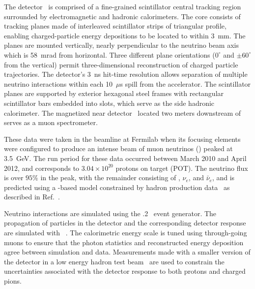 
The \minerva detector~\cite{Aliaga:2013uqz} is comprised of a fine-grained scintillator 
central tracking region surrounded by electromagnetic and hadronic calorimeters. 
The core consists of tracking planes made of interleaved scintillator 
strips of triangular profile, enabling charged-particle energy depositions 
to be located to within 3~mm. The planes are mounted vertically, nearly perpendicular 
to the neutrino beam axis which is 58~mrad from horizontal.   
Three different plane orientations ($0^{\circ}$ and $\pm 60^{\circ}$ from the vertical) 
permit three-dimensional reconstruction of charged particle trajectories. 
The detector's 3~ns hit-time resolution allows separation of multiple neutrino interactions 
within each 10~$\mu$s spill from the accelerator. The scintillator planes
are supported by exterior hexagonal steel frames with rectangular 
scintillator bars embedded into slots, which serve as the side hadronic calorimeter. 
The magnetized \minos near detector~\cite{Michael:2008bc} located two meters 
downstream of \minerva serves as a muon spectrometer. 

These data were taken in the \numi beamline at Fermilab when its focusing elements 
were configured to produce an intense beam of muon neutrinos (\numu) peaked at 3.5~GeV. 
The run period for these data occurred between March 2010 and April 2012, and 
corresponds to $3.04\times{10}^{20}$ protons on target (POT). The neutrino flux is over 
$95\%$ \numu in the peak, with the remainder consisting of 
\numubar, $\nu_e$, and $\bar\nu_e$, and is predicted using a \geant-based model 
constrained by hadron production data~\cite{Alt:2006fr} 
as described in Ref.~\cite{Eberly:2014mra}.  

Neutrino interactions are simulated using the .2~\cite{Andreopoulos:2009rq} 
event generator. The propagation of particles in the detector and the corresponding detector response  
are simulated with \geant~\cite{Agostinelli:2002hh}. The calorimetric 
energy scale is tuned using through-going muons to ensure that the photon
statistics and reconstructed energy deposition agree between simulation and data.
Measurements made with a smaller version of the \minerva detector in a low energy 
hadron test beam~\cite{Aliaga:2013uqz} are used to constrain the 
uncertainties associated with the detector response to both protons and charged pions.  


